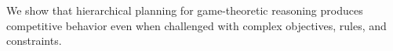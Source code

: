 \documentclass[12pt]{report}
\theoremstyle{definition}
\theoremstyle{remark}
\numberwithin{equation}{section}
\begin{document}
We show that hierarchical planning for game-theoretic reasoning produces competitive behavior even when challenged with complex objectives, rules, and constraints.


\tableofcontents   %

\listoftables      %
\listoffigures     %


% 






\appendices

\nocite{*}      %
\end{document}
